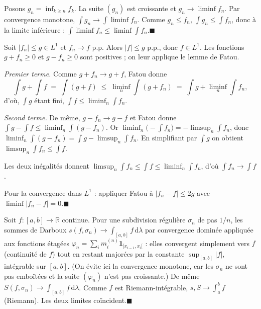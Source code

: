 \begin{mdframed}[style=proofbar]
  Posons $g_n = \inf_{k\geq n} f_k$. La suite $(g_n)$ est croissante et
  $g_n \to \liminf f_n$. Par convergence monotone,
  $\int g_n \to \int \liminf f_n$. Comme $g_n \leq f_n$,
  $\int g_n \leq \int f_n$, donc à la limite inférieure :
  $\int \liminf f_n \leq \liminf \int f_n$.\hfill$\blacksquare$
\end{mdframed}


\begin{mdframed}[style=proofbar]
  Soit $|f_n|\leq g \in L^1$ et $f_n \to f$ p.p. Alors $|f|\leq g$ p.p., donc
  $f \in L^1$. Les fonctions $g + f_n \geq 0$ et $g - f_n \geq 0$ sont
  positives ; on leur applique le lemme de Fatou.

  \smallskip
  \textit{Premier terme.}\enspace
  Comme $g + f_n \to g + f$, Fatou donne
  \[
    \int g + \int f
    \;=\; \int (g + f)
    \;\leq\; \liminf_n \int (g + f_n)
    \;=\; \int g + \liminf_n \int f_n,
  \]
  d'où, $\int g$ étant fini, $\displaystyle\int f \leq \liminf_n \int f_n$.

  \smallskip
  \textit{Second terme.}\enspace
  De même, $g - f_n \to g - f$ et Fatou donne
  $\int g - \int f \leq \liminf_n \int (g - f_n)$. Or
  $\liminf_n\!\big({-}\!\int f_n\big) = -\limsup_n \int f_n$, donc
  $\liminf_n \int (g - f_n) = \int g - \limsup_n \int f_n$. En simplifiant
  par $\int g$ on obtient
  $\displaystyle \limsup_n \int f_n \leq \int f$.

  \smallskip
  Les deux inégalités donnent
  $\displaystyle \limsup_n \int f_n \leq \int f \leq \liminf_n \int f_n$,
  d'où $\int f_n \to \int f$.

  \medskip
  Pour la convergence dans $L^1$ : appliquer Fatou à $|f_n - f| \leq 2g$
  avec $\liminf |f_n - f| = 0$.\hfill$\blacksquare$
\end{mdframed}


\begin{mdframed}[style=proofbar]
  Soit $f:[a,b]\to\mathbb{R}$ continue. Pour une subdivision régulière
  $\sigma_n$ de pas $1/n$, les sommes de Darboux
  $s(f,\sigma_n) \to \int_{[a,b]} f\,\mathrm{d}\lambda$ par convergence
  dominée appliquée aux fonctions étagées
  $\varphi_n = \sum_i m_i^{(n)} \mathbf{1}_{[x_{i-1},x_i[}$ : elles convergent
  simplement vers $f$ (continuité de $f$) tout en restant majorées par la
  constante $\sup_{[a,b]}|f|$, intégrable sur $[a,b]$. (On évite ici la
  convergence monotone, car les $\sigma_n$ ne sont pas emboîtées et la suite
  $(\varphi_n)$ n'est pas croissante.) De même
  $S(f,\sigma_n) \to \int_{[a,b]} f\,\mathrm{d}\lambda$. Comme $f$ est
  Riemann-intégrable, $s, S \to \int_a^b f$ (Riemann). Les deux limites
  coïncident.\hfill$\blacksquare$
\end{mdframed}

